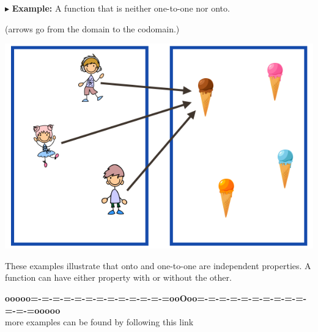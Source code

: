 \documentclass{ximera}
\begin{document}
$\blacktriangleright$ \textbf{Example:} A function that is neither one-to-one nor onto.  \\

\begin{center}
(arrows go from the domain to the codomain.)
\begin{image}
\includegraphics{pics/neither.png}
\end{image}
\end{center}




These examples illustrate that onto and one-to-one are independent properties.  A function can have either property with or without the other.
















\begin{center}
\textbf{\textcolor{green!50!black}{ooooo=-=-=-=-=-=-=-=-=-=-=-=-=ooOoo=-=-=-=-=-=-=-=-=-=-=-=-=ooooo}} \\

more examples can be found by following this link\\ 

\end{center}
\end{document}
